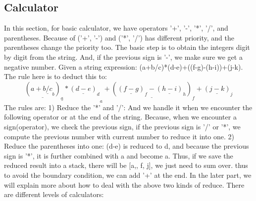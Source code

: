 \documentclass[../main.tex]{subfiles}
\begin{document}
\subsection{Calculator}
In this section, for basic calculator, we have operators '+', '-', '*', '/', and parentheses. Because of ('+', '-') and ('*', '/') has different priority, and the parentheses change the priority too. The basic step is to obtain the integers digit by digit from the string. And, if the previous sign is '-', we make sure we get a negative number.  Given a string expression: (a+b/c)*(d-e)+((f-g)-(h-i))+(j-k). The rule here is to deduct this to:
\begin{equation}
    \underline{\underline{(a+\underline{b/c}_b)}_a*\underline{(d-e)}_d}_a+\underline{(\underline{(f-g)}_f-\underline{(h-i)}_h)}_f+\underline{(j-k)}_j
\end{equation}
The rules are: 1) Reduce the '*' and '/': And we handle it when we encounter the following operator or at the end of the string. Because, when we encounter a sign(operator), we check the previous sign, if the previous sign is '/' or '*', we compute the previous number with current number to reduce it into one. 2) Reduce the parentheses into one: (d-e) is reduced to d, and because the previous sign is '*', it is further combined with a and become a. Thus, if we save the reduced result into a stack, there will be [a,, f, j], we just need to sum over. thus to avoid the boundary condition, we can add '+' at the end. In the later part, we will explain more about how to deal with the above two kinds of reduce. There are different levels of calculators:
\end{document}
